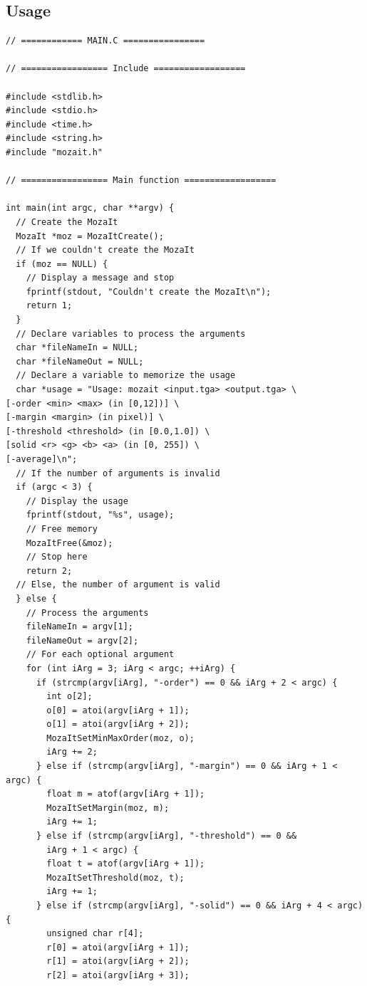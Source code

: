 \documentclass[12pt, a4paper]{article}
\begin{document}
\subsection{Usage}

\begin{scriptsize}
\begin{ttfamily}
\begin{lstlisting}
// ============ MAIN.C ================

// ================= Include ==================

#include <stdlib.h>
#include <stdio.h>
#include <time.h>
#include <string.h>
#include "mozait.h"

// ================= Main function ==================

int main(int argc, char **argv) {
  // Create the MozaIt
  MozaIt *moz = MozaItCreate();
  // If we couldn't create the MozaIt
  if (moz == NULL) {
    // Display a message and stop
    fprintf(stdout, "Couldn't create the MozaIt\n");
    return 1;
  }
  // Declare variables to process the arguments
  char *fileNameIn = NULL;
  char *fileNameOut = NULL;
  // Declare a variable to memorize the usage
  char *usage = "Usage: mozait <input.tga> <output.tga> \
[-order <min> <max> (in [0,12])] \
[-margin <margin> (in pixel)] \
[-threshold <threshold> (in [0.0,1.0]) \
[solid <r> <g> <b> <a> (in [0, 255]) \
[-average]\n";
  // If the number of arguments is invalid
  if (argc < 3) {
    // Display the usage
    fprintf(stdout, "%s", usage);
    // Free memory
    MozaItFree(&moz);
    // Stop here
    return 2;
  // Else, the number of argument is valid
  } else {
    // Process the arguments
    fileNameIn = argv[1];
    fileNameOut = argv[2];
    // For each optional argument
    for (int iArg = 3; iArg < argc; ++iArg) {
      if (strcmp(argv[iArg], "-order") == 0 && iArg + 2 < argc) {
        int o[2];
        o[0] = atoi(argv[iArg + 1]);
        o[1] = atoi(argv[iArg + 2]);
        MozaItSetMinMaxOrder(moz, o);
        iArg += 2;
      } else if (strcmp(argv[iArg], "-margin") == 0 && iArg + 1 < argc) {
        float m = atof(argv[iArg + 1]);
        MozaItSetMargin(moz, m);
        iArg += 1;
      } else if (strcmp(argv[iArg], "-threshold") == 0 && 
        iArg + 1 < argc) {
        float t = atof(argv[iArg + 1]);
        MozaItSetThreshold(moz, t);
        iArg += 1;
      } else if (strcmp(argv[iArg], "-solid") == 0 && iArg + 4 < argc) {
        unsigned char r[4];
        r[0] = atoi(argv[iArg + 1]);
        r[1] = atoi(argv[iArg + 2]);
        r[2] = atoi(argv[iArg + 3]);

\end{lstlisting}
\end{ttfamily}
\end{scriptsize}
\end{document}
